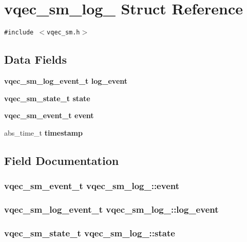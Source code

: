 \section{vqec\_\-sm\_\-log\_\- Struct Reference}
\label{structvqec__sm__log__}
{\tt \#include $<$vqec\_\-sm.h$>$}

\subsection*{Data Fields}
\begin{CompactItemize}
\item 
\bf{vqec\_\-sm\_\-log\_\-event\_\-t} \bf{log\_\-event}
\item 
\bf{vqec\_\-sm\_\-state\_\-t} \bf{state}
\item 
\bf{vqec\_\-sm\_\-event\_\-t} \bf{event}
\item 
abs\_\-time\_\-t \bf{timestamp}
\end{CompactItemize}


\subsection{Field Documentation}
\subsubsection{\setlength{\rightskip}{0pt plus 5cm}\bf{vqec\_\-sm\_\-event\_\-t} \bf{vqec\_\-sm\_\-log\_\-::event}}\label{structvqec__sm__log___c9bfdb3cfa289bdf3abeba0ccba534e5}


\subsubsection{\setlength{\rightskip}{0pt plus 5cm}\bf{vqec\_\-sm\_\-log\_\-event\_\-t} \bf{vqec\_\-sm\_\-log\_\-::log\_\-event}}\label{structvqec__sm__log___3945acae81bd05148ebbfecd936b0e56}


\subsubsection{\setlength{\rightskip}{0pt plus 5cm}\bf{vqec\_\-sm\_\-state\_\-t} \bf{vqec\_\-sm\_\-log\_\-::state}}\label{structvqec__sm__log___9c853c46c6b9207d2aeb63377286dfc6}


